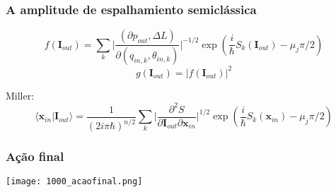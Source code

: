 \documentclass{beamer}
\newcommand{\braket}[2]{\langle #1|#2\rangle}
\begin{document}
\begin{frame}
  \frametitle{A amplitude de espalhamiento semiclássica}
  
  \begin{equation}
    f(\mathbf{I}_{out})=
    \displaystyle\sum_k \bigg| \frac{(\partial p_{out}, \Delta L)}
                    {\partial (q_{in,k}, \theta_{in,k})} \bigg|^{-1/2}
                    \exp(\frac{i}{\hbar}S_k (\mathbf{I}_{out})-\mu_j\pi/2)
  \end{equation}
  \begin{equation}
    g(\mathbf{I}_{out})=|f(\mathbf{I}_{out})|^2
   \end{equation}

Miller:
\begin{equation}
\braket{\mathbf{x}_{in}}{\mathbf{I}_{out}}=\frac{1}{(2i \pi \hbar)^{n/2}}
  \displaystyle\sum_{k}
  \bigg| \frac{\partial^2 S}
                    {\partial\mathbf{I}_{out}\partial\mathbf{x}_{in}} \bigg|^{1/2}
                    \exp(\frac{i}{\hbar}S_k (\mathbf{x}_{in})-\mu_j\pi/2)
\end{equation}


\end{frame}

\begin{frame}
  \frametitle{Ação final}
  \begin{center}
    \texttt{[image: 1000\_acaofinal.png]}
  \end{center}
\end{frame}  
\end{document}
